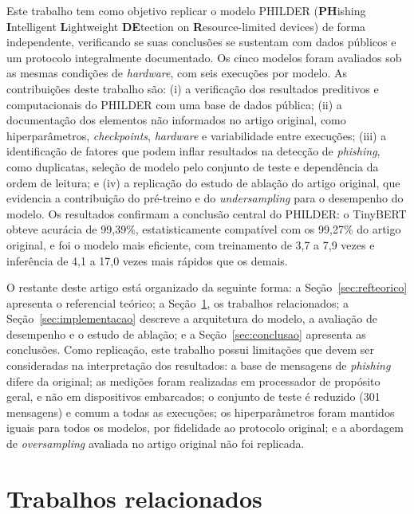 \documentclass[12pt]{article}
\begin{document}
        
       Este trabalho tem como objetivo replicar o modelo PHILDER (\textbf{PH}ishing \textbf{I}ntelligent \textbf{L}ightweight \textbf{DE}tection on \textbf{R}esource-limited devices) de forma independente, verificando se suas conclusões se sustentam com dados públicos e um protocolo integralmente documentado. Os cinco modelos foram avaliados sob as mesmas condições de \textit{hardware}, com seis execuções por modelo. As contribuições deste trabalho são: (i) a verificação dos resultados preditivos e computacionais do PHILDER com uma base de dados pública; (ii) a documentação dos elementos não informados no artigo original, como hiperparâmetros, \textit{checkpoints}, \textit{hardware} e variabilidade entre execuções; (iii) a identificação de fatores que podem inflar resultados na detecção de \textit{phishing}, como duplicatas, seleção de modelo pelo conjunto de teste e dependência da ordem de leitura; e (iv) a replicação do estudo de ablação do artigo original, que evidencia a contribuição do pré-treino e do \textit{undersampling} para o desempenho do modelo. Os resultados confirmam a conclusão central do PHILDER: o TinyBERT obteve acurácia de 99,39\%, estatisticamente compatível com os 99,27\% do artigo original, e foi o modelo mais eficiente, com treinamento de 3,7 a 7,9 vezes e inferência de 4,1 a 17,0 vezes mais rápidos que os demais.

        O restante deste artigo está organizado da seguinte forma: a Seção~\ref{sec:refteorico} apresenta o referencial teórico; a Seção~\ref{sec:trabalhos}, os trabalhos relacionados; a Seção~\ref{sec:implementacao} descreve a arquitetura do modelo, a avaliação de desempenho e o estudo de ablação; e a Seção~\ref{sec:conclusao} apresenta as conclusões. Como replicação, este trabalho possui limitações que devem ser consideradas na interpretação dos resultados: a base de mensagens de \textit{phishing} difere da original; as medições foram realizadas em processador de propósito geral, e não em dispositivos embarcados; o conjunto de teste é reduzido (301 mensagens) e comum a todas as execuções; os hiperparâmetros foram mantidos iguais para todos os modelos, por fidelidade ao protocolo original; e a abordagem de \textit{oversampling} avaliada no artigo original não foi replicada.

      
\section{Trabalhos relacionados} \label{sec:trabalhos}
\end{document}
